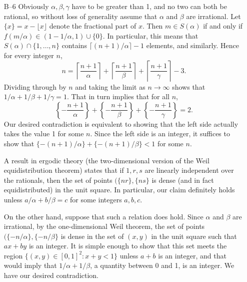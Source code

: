 \documentclass[amssymb,twocolumn,pra,10pt,aps]{revtex4-1}
\begin{document}
\begin{itemize}
\item[B--6]
Obviously $\alpha, \beta, \gamma$ have to be greater than 1, and no
two can both be rational, so without loss of generality assume that
$\alpha$ and $\beta$ are irrational.
Let $\{x\} = x - \lfloor x \rfloor$ denote the fractional part of $x$.
Then $m \in S(\alpha)$ if and only if $f(m/\alpha) \in (1-1/\alpha,1)
\cup \{0\}$. In particular, this means that $S(\alpha) \cap \{1,
\dots, n\}$ contains $\lceil (n+1)/\alpha \rceil -1$ elements, and
similarly. Hence for every integer $n$,
\[
n = \left\lceil \frac{n+1}\alpha \right\rceil +
 \left\lceil \frac{n+1}\beta \right\rceil +
 \left\lceil \frac{n+1}\gamma \right\rceil -3.
\]
Dividing through by $n$ and taking the limit as $n \to \infty$ shows
that $1/\alpha + 1/\beta + 1/\gamma = 1$. That in turn implies that
for all $n$,
\[
\left\{ - \frac{n+1}{\alpha} \right\} +
\left\{ - \frac{n+1}{\beta} \right\} +
\left\{ - \frac{n+1}{\gamma} \right\} = 2.
\]
Our desired contradiction is equivalent to showing that the left side actually
takes the value 1 for some $n$. Since the left side is
an integer, it suffices to show that $\{ -(n+1)/\alpha\} +
\{-(n+1)/\beta\} < 1$ for some $n$.

A result in ergodic theory (the two-dimensional version of the Weil
equidistribution theorem) states that if $1,r,s$ are linearly
independent over the rationals, then the set of points $(\{nr\},
\{ns\}$ is dense (and in fact equidistributed) in the unit square. In
particular, our claim definitely holds unless $a/\alpha + b/\beta =
c$ for some integers $a,b,c$.

On the other hand, suppose that such a relation does hold. Since
$\alpha$ and $\beta$ are irrational, by the one-dimensional Weil
theorem, the set of points $(\{-n/\alpha\}, \{-n/\beta\}$ is dense in
the set of $(x,y)$ in the unit square such that $ax + by$ is an integer.
It is simple enough to show that this set meets the region $\{(x,y)
\in [0,1]^{2}: x+y<1\}$ unless $a+b$ is an integer, and that would
imply that $1/\alpha + 1/\beta$, a quantity between 0 and 1, is an
integer. We have our desired contradiction.

\end{itemize}
\end{document}
